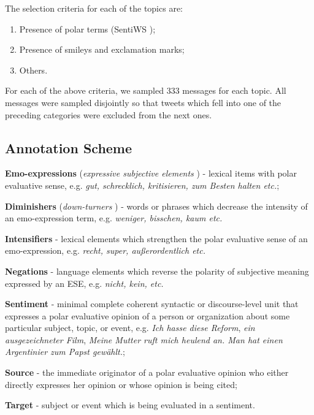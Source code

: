 \documentclass{beamer}
\begin{document}
    \begin{frame}{\insertsubsection}
      The selection criteria for each of the topics are:
      \begin{enumerate}
      \item Presence of polar terms (SentiWS \cite{Remus-10});
      \item Presence of smileys and exclamation marks;
      \item Others.
      \end{enumerate}
      For each of the above criteria, we sampled 333 messages for each
      topic.  All messages were sampled disjointly so that tweets
      which fell into one of the preceding categories were excluded
      from the next ones.
    \end{frame}

    \subsection{Annotation Scheme}
    \begin{frame}{\insertsubsection}
      \textbf{Emo-expressions} (\textit{expressive subjective
        elements} \cite{Wiebe-05}) - lexical items with polar
      evaluative sense, e.g. \textit{gut, schrecklich, kritisieren,
        zum Besten halten etc.};

      \textbf{Diminishers} (\textit{down-turners} \cite{Taboada-11}) -
      words or phrases which decrease the intensity of an
      emo-expression term, e.g. \textit{weniger, bisschen, kaum etc.}

      \textbf{Intensifiers} - lexical elements which strengthen the
      polar evaluative sense of an emo-expression, e.g. \textit{recht,
        super, au\ss{}erordentlich etc.}

      \textbf{Negations} - language elements which reverse the
      polarity of subjective meaning expressed by an ESE,
      e.g. \textit{nicht, kein, etc.}
    \end{frame}

    \begin{frame}{\insertsubsection}
      \textbf{Sentiment} - minimal complete coherent syntactic or
      discourse-level unit that expresses a polar evaluative opinion
      of a person or organization about some particular subject,
      topic, or event, e.g. \textit{Ich hasse diese Reform},
      \textit{ein ausgezeichneter Film}, \textit{Meine Mutter ruft
        mich heulend an.  Man hat einen Argentinier zum Papst
        gew\"ahlt.};

      \textbf{Source} - the immediate originator of a polar evaluative
      opinion who either directly expresses her opinion or whose
      opinion is being cited;

      \textbf{Target} - subject or event which is being evaluated in a
      sentiment.
    \end{frame}
\end{document}
